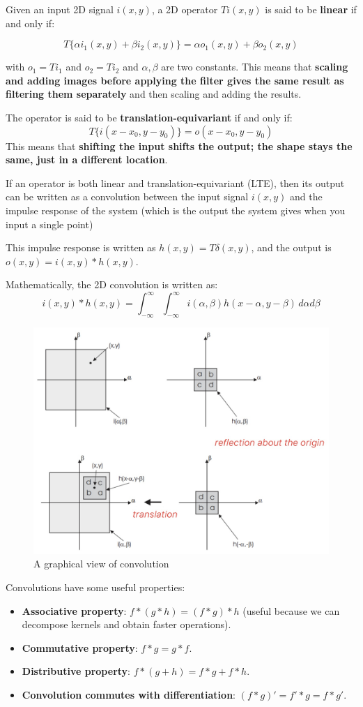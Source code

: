 Given an input 2D signal $i(x,y)$, a 2D operator $T{i(x,y)}$ is said to be \textbf{linear} if and only if:
 
$$T\{\alpha i_1(x,y) + \beta i_2(x,y)\} = \alpha o_1(x,y) + \beta o_2(x,y)$$

with $o_1 = T{i_1}$ and $o_2 = T{i_2}$ and $\alpha, \beta$ are two constants.
This means that \textbf{scaling and adding images before applying the filter gives the same result as filtering them separately} and then scaling and adding the results.

The operator is said to be \textbf{translation-equivariant} if and only if:
$$T\{i(x-x_0, y-y_0)\} = o(x-x_0, y-y_0)$$
This means that \textbf{shifting the input shifts the output; the shape stays the same, just in a different location}.

If an operator is both linear and translation-equivariant (LTE), then its output can be written as a convolution between the input signal $i(x,y)$ and the impulse response of the system (which is the output the system gives when you input a single point)

This impulse response is written as $h(x,y) = T{\delta (x,y)}$, and the output is $o(x,y) = i(x,y) * h(x,y)$.

Mathematically, the 2D convolution is written as:
$$i(x,y) * h(x,y) = \int_{-\infty}^{\infty} \int_{-\infty}^{\infty} i(\alpha, \beta) h(x-\alpha, y-\beta) \, d\alpha  d\beta $$

\begin{figure}[htbp]
  \centering
  \includegraphics[width=0.6\linewidth]{./img/graphical_convolution.jpg}
  \caption{A graphical view of convolution}
  \label{fig:graphical_convolution}
\end{figure}

Convolutions have some useful properties:
\begin{itemize}
  \item \textbf{Associative property}: $f * (g * h) = (f*g)*h$ (useful because we can decompose kernels and obtain faster operations).
  \item \textbf{Commutative property}: $f*g = g*f$.
  \item \textbf{Distributive property}: $f*(g+h) = f*g + f*h$.
  \item \textbf{Convolution commutes with differentiation}: $(f*g)' = f'*g = f*g'$.
\end{itemize}

